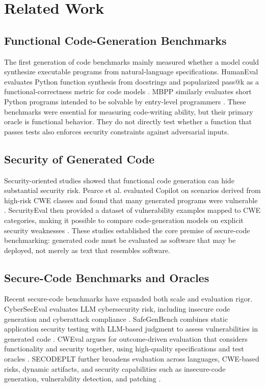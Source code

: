 \documentclass[11pt]{article}
\begin{document}
\section{Related Work}

\subsection{Functional Code-Generation Benchmarks}

The first generation of code benchmarks mainly measured whether a model could synthesize executable programs from natural-language specifications. HumanEval evaluates Python function synthesis from docstrings and popularized pass@k as a functional-correctness metric for code models \cite{chen2021codex}. MBPP similarly evaluates short Python programs intended to be solvable by entry-level programmers \cite{austin2021programsynthesis}. These benchmarks were essential for measuring code-writing ability, but their primary oracle is functional behavior. They do not directly test whether a function that passes tests also enforces security constraints against adversarial inputs.

\subsection{Security of Generated Code}

Security-oriented studies showed that functional code generation can hide substantial security risk. Pearce et al. evaluated Copilot on scenarios derived from high-risk CWE classes and found that many generated programs were vulnerable \cite{pearce2022asleep}. SecurityEval then provided a dataset of vulnerability examples mapped to CWE categories, making it possible to compare code-generation models on explicit security weaknesses \cite{siddiq2022securityeval}. These studies established the core premise of secure-code benchmarking: generated code must be evaluated as software that may be deployed, not merely as text that resembles software.

\subsection{Secure-Code Benchmarks and Oracles}

Recent secure-code benchmarks have expanded both scale and evaluation rigor. CyberSecEval evaluates LLM cybersecurity risk, including insecure code generation and cyberattack compliance \cite{bhatt2023cyberseceval}. SafeGenBench combines static application security testing with LLM-based judgment to assess vulnerabilities in generated code \cite{li2025safegenbench}. CWEval argues for outcome-driven evaluation that considers functionality and security together, using high-quality specifications and test oracles \cite{peng2025cweval}. SECODEPLT further broadens evaluation across languages, CWE-based risks, dynamic artifacts, and security capabilities such as insecure-code generation, vulnerability detection, and patching \cite{nie2025secodeplt}.
\end{document}
